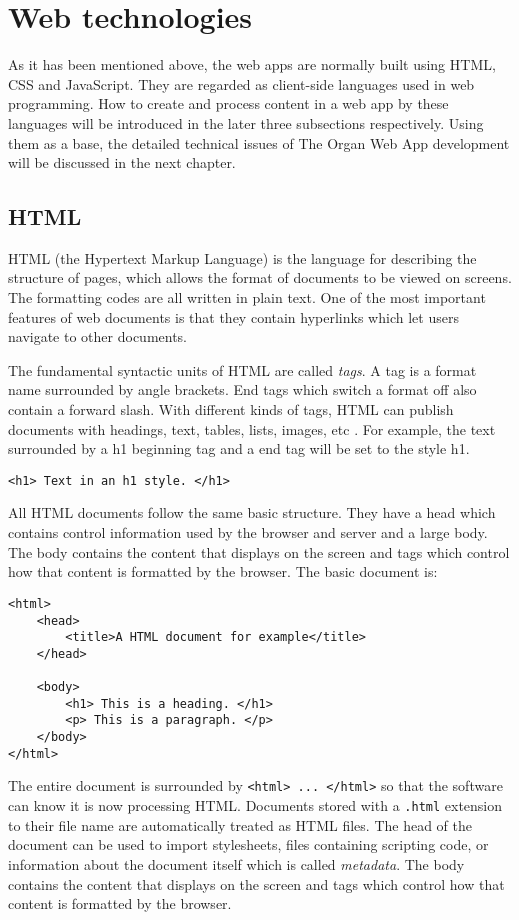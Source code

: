 \section{Web technologies}

As it has been mentioned above, the web apps are normally built using HTML, CSS and JavaScript. They are regarded as client-side languages used in web programming. How to create and process content in a web app by these languages will be introduced in the later three subsections respectively. Using them as a base, the detailed technical issues of The Organ Web App development will be discussed in the next chapter.

\subsection{HTML}

HTML (the Hypertext Markup Language) \cite{raggett1999html} is the language for describing the structure of pages, which allows the format of documents to be viewed on screens. The formatting codes are all written in plain text. One of the most important features of web documents is that they contain hyperlinks which let users navigate to other documents.

The fundamental syntactic units of HTML are called \emph{tags}. A tag is a format name surrounded by angle brackets. End tags which switch a format off also contain a forward slash. With different kinds of tags, HTML can publish documents with headings, text, tables, lists, images, etc \cite{sebesta2008programming}. For example, the text surrounded by a h1 beginning tag and a end tag will be set to the style h1.
\begin{verbatim}
<h1> Text in an h1 style. </h1>
\end{verbatim}

All HTML documents follow the same basic structure. They have a head which contains control information used by the browser and server and a large body. The body contains the content that displays on the screen and tags which control how that content is formatted by the browser. The basic document is:
\begin{verbatim}
<html>
    <head>
        <title>A HTML document for example</title>
    </head>
	
    <body>
        <h1> This is a heading. </h1>
        <p> This is a paragraph. </p>
    </body>
</html>
\end{verbatim}
The entire document is surrounded by \verb|<html> ... </html>| so that the software can know it is now processing HTML. Documents stored with a \verb|.html| extension to their file name are automatically treated as HTML files. The head of the document can be used to import stylesheets, files containing scripting code, or information about the document itself which is called \emph{metadata}. The body contains the content that displays on the screen and tags which control how that content is formatted by the browser. 

